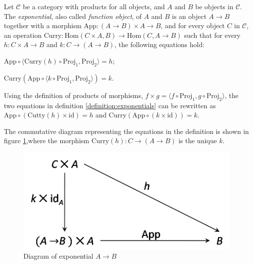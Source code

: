 \begin{definition}
\label{definition:exponentials}
Let $ \mathcal{C} $ be a category with products for all objects, and $ A $ and $ B $ be objects in $ \mathcal{C} $. The \emph{exponential}, also called \emph{function object}, of $ A $ and $ B $ is an object $ A \to B $ together with a morphism $ \text{App} : ( A \to B ) \times A \to B $, and for every object $ C $ in $ \mathcal{C} $, an operation $ \text{Curry} : \text{Hom}(C \times A,B) \to \text{Hom}(C, A \to B) $ such that for every $ h: C \times A \to B $ and $ k: C \to ( A \to B ) $, the following equations hold:
\begin{myitemize}
\item $ \text{App} \circ \langle \text{Curry} (h) \circ \text{Proj}_1 , \text{Proj}_2 \rangle = h $;
\item $ \text{Curry} ( \text{App} \circ \langle k \circ \text{Proj}_1 , \text{Proj}_2 \rangle ) = k $.
\end{myitemize}
\end{definition}

Using the definition of products of morphisms, $ f \times g = \langle f \circ \text{Proj}_1 , g \circ \text{Proj}_2 \rangle $, the two equations in definition \ref{definition:exponentials} can be rewritten as $ \text{App} \circ ( \text{Cutty}(h) \times \text{id} ) = h $ and $ \text{Curry}( \text{App} \circ (k \times \text{id})) = k $.

The commutative diagram representing the equations in the definition is shown in figure \ref{figure:cat_ex},where the morphism $ \text{Curry}(h): C \to (A \to B) $ is the unique $ k $.
\begin{figure}[h!]
\centering
\includegraphics[scale=0.48]{./images/cat_ex}
\caption{Diagram of exponential $ A \to B $}
\label{figure:cat_ex}
\end{figure}

